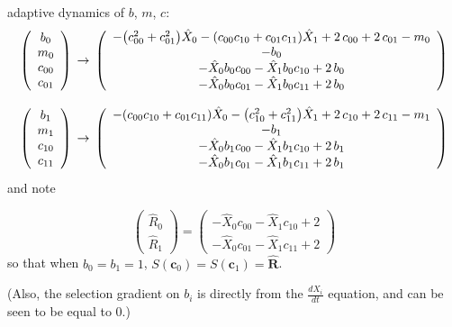 \documentclass{article}
\begin{document}
adaptive dynamics of $b$, $m$, $c$:
\[\left(\begin{array}{c}
  b_{0}\\
  m_{0}\\
  c_{00}\\
  c_{01}
\end{array}\right)\\
\to\\
\left(\begin{array}{c}
  -{\left(c_{00}^{2} + c_{01}^{2}\right)} \hat{X}_{0} - {\left(c_{00} c_{10} + c_{01} c_{11}\right)} \hat{X}_{1} + 2 \, c_{00} + 2 \, c_{01} - m_{0}\\
  -b_{0}\\
  -\hat{X}_{0} b_{0} c_{00} - \hat{X}_{1} b_{0} c_{10} + 2 \, b_{0}\\
  -\hat{X}_{0} b_{0} c_{01} - \hat{X}_{1} b_{0} c_{11} + 2 \, b_{0}
\end{array}\right)\]

\[\left(\begin{array}{c}
  b_{1}\\
  m_{1}\\
  c_{10}\\
  c_{11}
\end{array}\right)\\
\to\\
\left(\begin{array}{c}
  -{\left(c_{00} c_{10} + c_{01} c_{11}\right)} \hat{X}_{0} - {\left(c_{10}^{2} + c_{11}^{2}\right)} \hat{X}_{1} + 2 \, c_{10} + 2 \, c_{11} - m_{1}\\
  -b_{1}\\
  -\hat{X}_{0} b_{1} c_{00} - \hat{X}_{1} b_{1} c_{10} + 2 \, b_{1}\\
  -\hat{X}_{0} b_{1} c_{01} - \hat{X}_{1} b_{1} c_{11} + 2 \, b_{1}
\end{array}\right)\]
and note

\[
  \left(\begin{array}{c}
  \hat{R}_{0}\\
  \hat{R}_{1}
\end{array}\right) = \left(\begin{array}{c}
  -\hat{X}_{0} c_{00} - \hat{X}_{1} c_{10} + 2\\
  -\hat{X}_{0} c_{01} - \hat{X}_{1} c_{11} + 2
\end{array}\right)
\]
so that when $b_0=b_1=1$, $S(\mathbf{c}_0)=S(\mathbf{c}_1)=\hat{\mathbf{R}}$.

(Also, the selection gradient on $b_i$ is directly from the $\frac{dX_i}{dt}$ equation, and can be seen to be equal to 0.)
\end{document}
